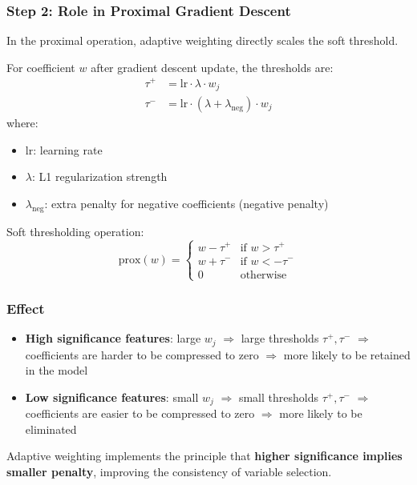 \documentclass{article}
\begin{document}
\subsubsection{Step 2: Role in Proximal Gradient Descent}

In the proximal operation, adaptive weighting directly scales the soft threshold.

For coefficient $w$ after gradient descent update, the thresholds are:
\[
\begin{aligned}
\tau^+ &= \text{lr} \cdot \lambda \cdot w_j \\
\tau^- &= \text{lr} \cdot (\lambda + \lambda_{\text{neg}}) \cdot w_j
\end{aligned}
\]
where:
\begin{itemize}
\item $\text{lr}$: learning rate
\item $\lambda$: L1 regularization strength
\item $\lambda_{\text{neg}}$: extra penalty for negative coefficients (negative penalty)
\end{itemize}

Soft thresholding operation:
\[
\text{prox}(w) =
\begin{cases}
w - \tau^+ & \text{if } w > \tau^+ \\
w + \tau^- & \text{if } w < -\tau^- \\
0 & \text{otherwise}
\end{cases}
\]

\subsubsection{Effect}

\begin{itemize}
\item \textbf{High significance features}: large $w_j$ $\Rightarrow$ large thresholds $\tau^+, \tau^-$ $\Rightarrow$ coefficients are harder to be compressed to zero $\Rightarrow$ more likely to be retained in the model
\item \textbf{Low significance features}: small $w_j$ $\Rightarrow$ small thresholds $\tau^+, \tau^-$ $\Rightarrow$ coefficients are easier to be compressed to zero $\Rightarrow$ more likely to be eliminated
\end{itemize}

Adaptive weighting implements the principle that \textbf{higher significance implies smaller penalty}, improving the consistency of variable selection.
\end{document}
